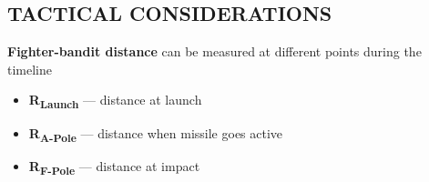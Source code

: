 
\subsection{TACTICAL CONSIDERATIONS}
\label{sec:ttp_aa:bvr_fundamentals:tacticalconsideration}
\begin{tcoloritemize}
    \textbf{Fighter-bandit distance} can be measured at different points during the timeline

    \begin{itemize}
        \item \textbf{R\textsubscript{Launch}} --- distance at launch
        \item \textbf{R\textsubscript{A-Pole}} --- distance when missile goes active
        \item \textbf{R\textsubscript{F-Pole}} --- distance at impact
    \end{itemize}
    

\end{tcoloritemize}
